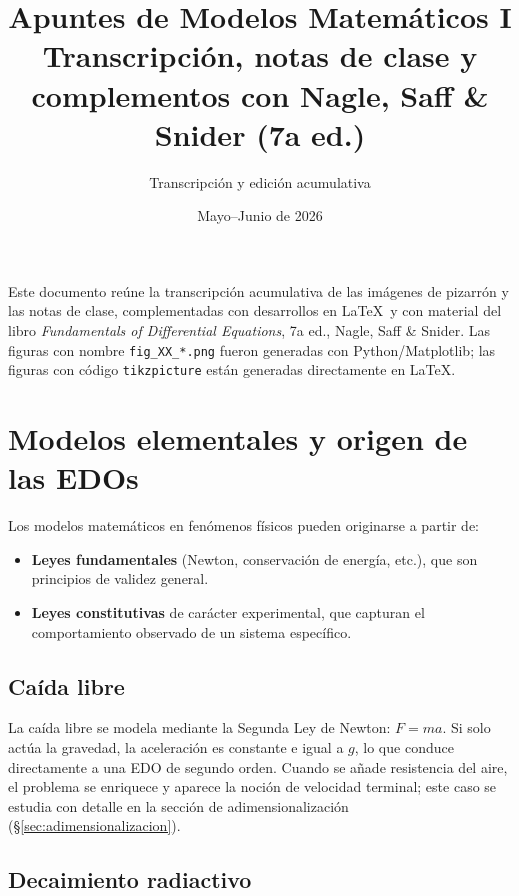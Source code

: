 \documentclass[11pt,letterpaper]{article}
\title{\textbf{Apuntes de Modelos Matemáticos I}\\[4pt]
       \large Transcripción, notas de clase y complementos con Nagle, Saff \& Snider (7a ed.)}
\author{Transcripción y edición acumulativa}
\date{Mayo--Junio de 2026}
\begin{document}
\maketitle

\begin{tcolorbox}[colback=gray!8, colframe=gray!50, title=Nota sobre este documento]
Este documento reúne la transcripción acumulativa de las imágenes de pizarrón
y las notas de clase, complementadas con desarrollos en \LaTeX\ y con material del libro
\emph{Fundamentals of Differential Equations}, 7a ed., Nagle, Saff \& Snider.
Las figuras con nombre \texttt{fig\_XX\_*.png} fueron generadas con Python/Matplotlib;
las figuras con código \texttt{tikzpicture} están generadas directamente en \LaTeX.
\end{tcolorbox}

\tableofcontents
\newpage

\section{Modelos elementales y origen de las EDOs}

Los modelos matemáticos en fenómenos físicos pueden originarse a partir de:
\begin{itemize}
    \item \textbf{Leyes fundamentales} (Newton, conservación de energía, etc.),
          que son principios de validez general.
    \item \textbf{Leyes constitutivas} de carácter experimental, que capturan el
          comportamiento observado de un sistema específico.
\end{itemize}

\subsection{Caída libre}

La caída libre se modela mediante la Segunda Ley de Newton: $F=ma$. Si solo
actúa la gravedad, la aceleración es constante e igual a $g$, lo que conduce
directamente a una EDO de segundo orden. Cuando se añade resistencia del aire,
el problema se enriquece y aparece la noción de velocidad terminal; este caso
se estudia con detalle en la sección de adimensionalización
(§\ref{sec:adimensionalizacion}).

\subsection{Decaimiento radiactivo}
\end{document}
